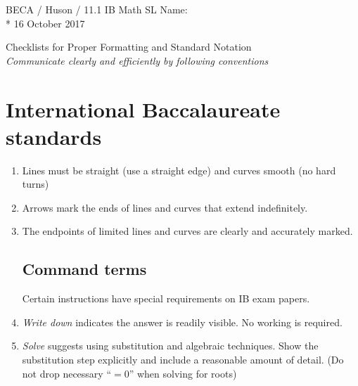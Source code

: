 \documentclass[]{book}
\begin{document}
\noindent BECA / Huson / 11.1 IB Math SL \hspace{2in} Name:\\*
16 October 2017
\begin{center}
{\Large Checklists for Proper Formatting and Standard Notation}\\
\textit{Communicate clearly and efficiently by following conventions}
\end{center}



\section*{International Baccalaureate standards}


\begin{enumerate}
\subsection*{Graphing}

\item Lines must be straight (use a straight edge) and curves smooth (no hard turns)
\item Arrows mark the ends of lines and curves that extend indefinitely. 
\item The endpoints of limited lines and curves are clearly and accurately marked.

\subsection*{Command terms}
Certain instructions have special requirements on IB exam papers.
\item \emph{Write down} indicates the answer is readily visible. No working is required.
\item \emph{Solve} suggests using substitution and algebraic techniques. Show the substitution step explicitly and include a reasonable amount of detail. (Do not drop necessary ``$=0$'' when solving for roots)
\end{enumerate}
\end{document}
